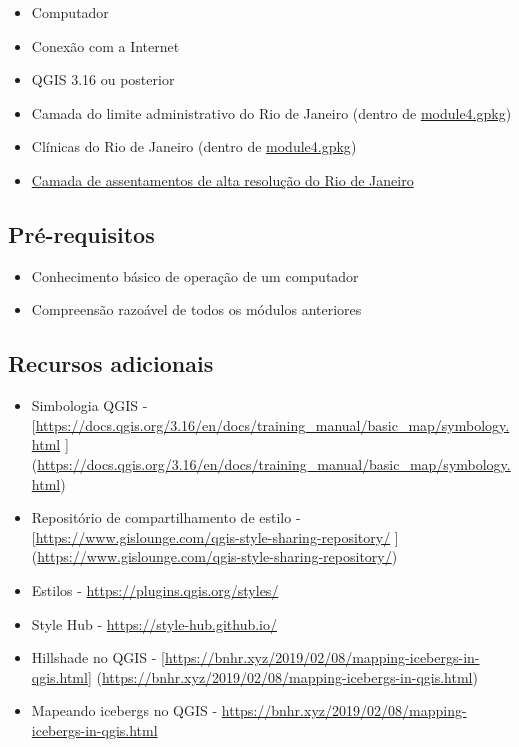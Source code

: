 \documentclass[
  portuguese,
]{krantz}
\providecommand{\tightlist}{%
  \setlength{\itemsep}{0pt}\setlength{\parskip}{0pt}}
\begin{document}
\begin{itemize}
\tightlist
\item
  Computador
\item
  Conexão com a Internet
\item
  QGIS 3.16 ou posterior
\item
  Camada do limite administrativo do Rio de Janeiro (dentro de \href{data/module4.gpkg}{module4.gpkg})
\item
  Clínicas do Rio de Janeiro (dentro de \href{data/module4.gpkg}{module4.gpkg})
\item
  \href{data/hrsl_rj_capital_populacao.tif}{Camada de assentamentos de alta resolução do Rio de Janeiro}
\end{itemize}

\hypertarget{pruxe9-requisitos-4}{%
\subsection{Pré-requisitos}\label{pruxe9-requisitos-4}}

\begin{itemize}
\tightlist
\item
  Conhecimento básico de operação de um computador
\item
  Compreensão razoável de todos os módulos anteriores
\end{itemize}

\hypertarget{recursos-adicionais-4}{%
\subsection{Recursos adicionais}\label{recursos-adicionais-4}}

\begin{itemize}
\tightlist
\item
  Simbologia QGIS - {[}\url{https://docs.qgis.org/3.16/en/docs/training_manual/basic_map/symbology.html} {]} (\url{https://docs.qgis.org/3.16/en/docs/training_manual/basic_map/symbology.html})
\item
  Repositório de compartilhamento de estilo - {[}\url{https://www.gislounge.com/qgis-style-sharing-repository/} {]} (\url{https://www.gislounge.com/qgis-style-sharing-repository/})
\item
  Estilos - \href{https://plugins.qg\%20is.org/styles/}{https://plugins.qgis.org/styles/}
\item
  Style Hub - \url{https://style-hub.github.io/}
\item
  Hillshade no QGIS - {[}\url{https://bnhr.xyz/2019/02/08/mapping-icebergs-in-qgis.html}{]} (\url{https://bnhr.xyz/2019/02/08/mapping-icebergs-in-qgis.html})
\item
  Mapeando icebergs no QGIS - \url{https://bnhr.xyz/2019/02/08/mapping-icebergs-in-qgis.html}
\end{itemize}
\end{document}
